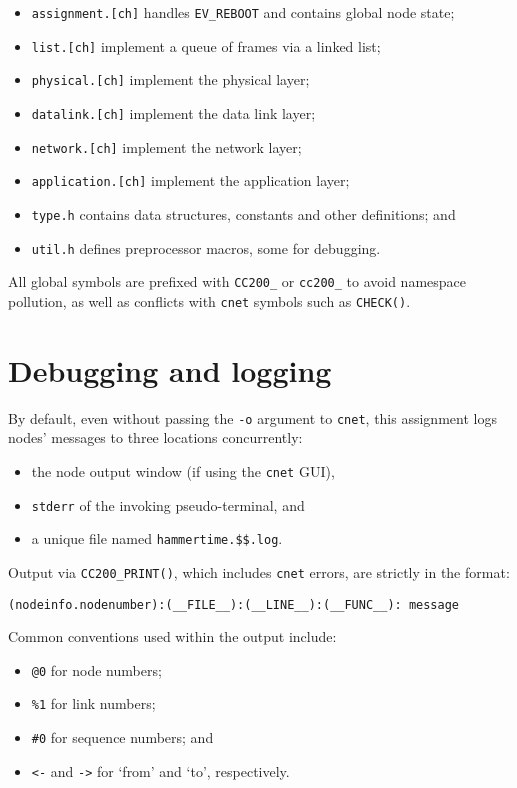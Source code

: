 \documentclass[a4paper,12pt,titlepage]{article}
\begin{document}
\begin{itemize}
	\item \texttt{assignment.[ch]} handles \texttt{EV\_REBOOT} and contains
	      global node state;
	\item \texttt{list.[ch]} implement a queue of frames via a linked list;
	\item \texttt{physical.[ch]} implement the physical layer;
	\item \texttt{datalink.[ch]} implement the data link layer;
	\item \texttt{network.[ch]} implement the network layer;
	\item \texttt{application.[ch]} implement the application layer;
	\item \texttt{type.h} contains data structures, constants and other
	      definitions; and
	\item \texttt{util.h} defines preprocessor macros, some for debugging.
\end{itemize}

All global symbols are prefixed with \texttt{CC200\_} or \texttt{cc200\_} to
avoid namespace pollution, as well as conflicts with \texttt{cnet} symbols such
as \texttt{CHECK()}.

\section{Debugging and logging}

By default, even without passing the \texttt{-o} argument to \texttt{cnet},
this assignment logs nodes' messages to three locations concurrently:

\begin{itemize}
	\item the node output window (if using the \texttt{cnet} GUI),
	\item \texttt{stderr} of the invoking pseudo-terminal, and
	\item a unique file named \texttt{hammertime.\$\$.log}.
\end{itemize}

Output via \texttt{CC200\_PRINT()}, which includes \texttt{cnet} errors, are
strictly in the format:

\begin{lstlisting}
(nodeinfo.nodenumber):(__FILE__):(__LINE__):(__FUNC__): message
\end{lstlisting}

Common conventions used within the output include:

\begin{itemize}
	\item \texttt{@0} for node numbers;
	\item \texttt{\%1} for link numbers;
	\item \texttt{\#0} for sequence numbers; and
	\item \texttt{<-} and \texttt{->} for `from' and `to', respectively.
\end{itemize}
\end{document}
